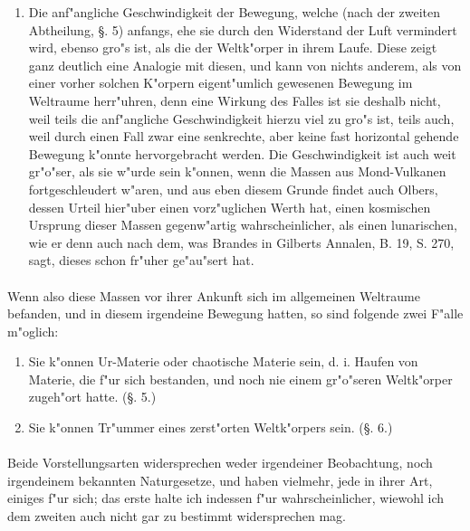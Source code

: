 \documentclass[a4paper, 11pt, oneside, polutonikogreek, german]{article}
\begin{document}
\begin{enumerate}
    \item Die anf"angliche Geschwindigkeit der Bewegung, welche (nach der zweiten Abtheilung, §. 5) anfangs, ehe sie durch den Widerstand der Luft vermindert wird, ebenso gro"s ist, als die der Weltk"orper in ihrem Laufe. Diese zeigt ganz deutlich eine Analogie mit diesen, und kann von nichts anderem, als von einer vorher solchen K"orpern eigent"umlich gewesenen Bewegung im Weltraume herr"uhren, denn eine Wirkung des Falles ist sie deshalb nicht, weil teils die anf"angliche Geschwindigkeit hierzu viel zu gro"s ist, teils auch, weil durch einen Fall zwar eine senkrechte, aber keine fast horizontal gehende Bewegung k"onnte hervorgebracht werden. Die Geschwindigkeit ist auch weit gr"o"ser, als sie w"urde sein k"onnen, wenn die Massen aus Mond-Vulkanen fortgeschleudert w"aren, und aus eben diesem Grunde findet auch Olbers, dessen Urteil hier"uber einen vorz"uglichen Werth hat, einen kosmischen Ursprung dieser Massen gegenw"artig wahrscheinlicher, als einen lunarischen, wie er denn auch nach dem, was Brandes in Gilberts Annalen, B. 19, S. 270, sagt, dieses schon fr"uher ge"au"sert hat.
\end{enumerate}
\paragraph{}
Wenn also diese Massen vor ihrer Ankunft sich im allgemeinen Weltraume befanden, und in diesem irgendeine Bewegung hatten, so sind folgende zwei F"alle m"oglich:
\begin{enumerate}
    \item Sie k"onnen Ur-Materie oder chaotische Materie sein, d. i. Haufen von Materie, die f"ur sich bestanden, und noch nie einem gr"o"seren Weltk"orper zugeh"ort hatte. (§. 5.)
    \item Sie k"onnen Tr"ummer eines zerst"orten Weltk"orpers sein. (§. 6.)
\end{enumerate}
\paragraph{}
Beide Vorstellungsarten widersprechen weder irgendeiner Beobachtung, noch irgendeinem bekannten Naturgesetze, und haben vielmehr, jede in ihrer Art, einiges f"ur sich; das erste halte ich indessen f"ur wahrscheinlicher, wiewohl ich dem zweiten auch nicht gar zu bestimmt widersprechen mag.
\subsection{}
\end{document}
